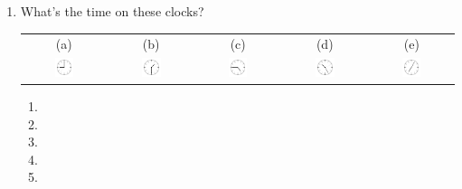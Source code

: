 \documentclass{tufte-book}
\begin{document}
\begin{enumerate}
  \item What's the time on these clocks?\par
  \begin{fullwidth}
  \begin{tabular}{ccccc}
    (a) & (b) & (c) & (d) & (e) \\
    \includegraphics[width=0.25\textwidth]{maths/fig/clock_0900.pdf} &
    \includegraphics[width=0.25\textwidth]{maths/fig/clock_0130.pdf} &
    \includegraphics[width=0.25\textwidth]{maths/fig/clock_0445.pdf} &
    \includegraphics[width=0.25\textwidth]{maths/fig/clock_1025.pdf} &
    \includegraphics[width=0.25\textwidth]{maths/fig/clock_0705.pdf}
  \end{tabular}
  \bigskip
  \begin{enumerate}
    \item \dotfill\bigskip
    \item \dotfill\bigskip
    \item \dotfill\bigskip
    \item \dotfill\bigskip
    \item \dotfill
  \end{enumerate}
  \end{fullwidth}\bigskip


\end{enumerate}
\end{document}
